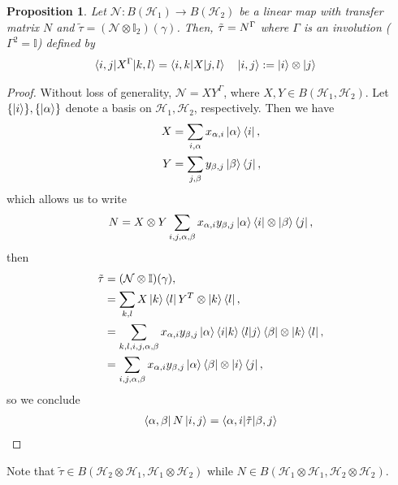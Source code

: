 \documentclass[10pt,oneside,longbibliography]{report}
\newtheorem{proposition}{Proposition}[section]
\begin{document}
\begin{proposition}
Let $\mathcal{N}: B(\mathcal{H}_1) \rightarrow B(\mathcal{H}_2)$ be a linear map with transfer matrix $N$ and $\tilde{\tau} = (\mathcal{N}\otimes \mathbb{I}_2)(\gamma)$. Then, $\Tilde{\tau}=N^{\Gamma}$ where $\Gamma$ is an involution ($\Gamma^2 = \mathbb{I}$) defined by 
\begin{align}
    \braket{i,j|X^{\Gamma}|k,l}&=\braket{i,k|X|j,l} \quad \ket{i,j}:= \ket{i}\otimes \ket{j}
\end{align}
\end{proposition}

\begin{tcolorbox}[colframe=black,breakable, colback=black!5, arc=0pt, outer arc=0pt,boxrule=0.5pt]
\begin{proof}
Without loss of generality, $\mathcal{N}=XY^{\Gamma}$, where $X,Y \in B(\mathcal{H}_1,\mathcal{H}_2)$. Let $\{\ket{i}\}, \{\ket{\alpha}\}$ denote a basis on $\mathcal{H}_1,\mathcal{H}_2$, respectively. Then we have 
\begin{align}
    X&=\sum_{i,\alpha} x_{\alpha,i} \ket{\alpha}\bra{i},\\
    Y&= \sum_{j,\beta} y_{\beta,j} \ket{\beta}\bra{j},
\end{align}
which allows us to write
\begin{align}
    N=X\otimes Y \sum_{i,j,\alpha,\beta} x_{\alpha,i} y_{\beta,j} \ket{\alpha}\bra{i} \otimes \ket{\beta}\bra{j},
\end{align}
then 
\begin{align}
    \tilde{\tau} &= (\mathcal{N}\otimes \mathbb{I})(\gamma),\\
    &= \sum_{k,l} X \ket{k}\bra{l} Y^T \otimes \ket{k}\bra{l}, \\
    &=\sum_{k,l,i,j,\alpha,\beta} x_{\alpha, i} y_{\beta,j} \ket{\alpha}\braket{i|k}\braket{l|j}\bra{\beta}\otimes \ket{k}\bra{l}, \\
    &= \sum_{i,j,\alpha,\beta} x_{\alpha,i} y_{\beta,j} \ket{\alpha}\bra{\beta} \otimes \ket{i}\bra{j},
\end{align}
so we conclude
\begin{align}
    \bra{\alpha,\beta}N\ket{i,j} = \braket{\alpha,i|\tilde{\tau}|\beta,j}
\end{align}
\end{proof}
Note that $\tilde{\tau}\in B(\mathcal{H}_2 \otimes \mathcal{H}_1,\mathcal{H}_1\otimes \mathcal{H}_2)$ while $N\in B(\mathcal{H}_1\otimes \mathcal{H}_1, \mathcal{H}_2 \otimes \mathcal{H}_2)$.
\end{tcolorbox}
\end{document}
